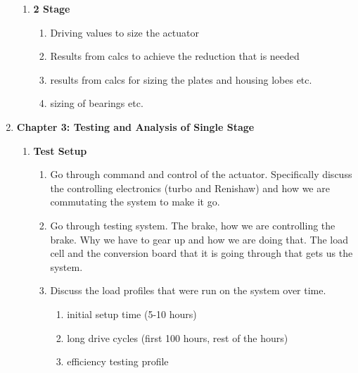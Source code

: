\begin{enumerate}
\begin{enumerate}
		\item \textbf{2 Stage}
		\begin{enumerate}
			\item
			Driving values to size the actuator
			\item
			Results from calcs to achieve the reduction that is needed 
			\item 
			results from calcs for sizing the plates and housing lobes etc.
			\item
			sizing of bearings etc.  
		\end{enumerate}
	\end{enumerate}

	\item \textbf{Chapter 3: Testing and Analysis of Single Stage}
	\begin{enumerate}
		\item \textbf{Test Setup}
		\begin{enumerate}
			\item
			Go through command and control of the actuator. Specifically discuss the controlling electronics (turbo and Renishaw) and how we are commutating the system to make it go. 
			\item
			Go through testing system. The brake, how we are controlling the brake. Why we have to gear up and how we are doing that. The load cell and the conversion board that it is going through that gets us the system. 
			\item
			Discuss the load profiles that were run on the system over time. 
			\begin{enumerate}
				\item initial setup time (5-10 hours)
				\item long drive cycles (first 100 hours, rest of the hours) 
				\item efficiency testing profile
			\end{enumerate}
		\end{enumerate}


\end{enumerate}
\end{enumerate}
